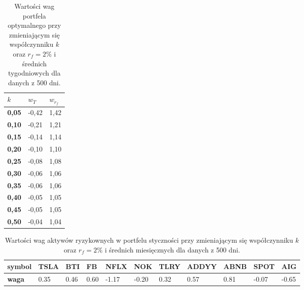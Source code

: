 \documentclass[magister]{dyplom}
\begin{document}
\begin{table}[ht]
	\centering
	\caption{Wartości wag portfela optymalnego przy zmieniającym się współczynniku $k$ oraz $r_f = 2\%$ i średnich tygodniowych dla danych z 500 dni.}
	\begin{tabular}{|l|l|l|}
		\hline
		\textbf{$k$} & \textbf{$w_T$} & \textbf{$w_{r_f}$} \\ \hline
		\textbf{0,05}                                             & -0,42         & 1,42           \\ \hline
		\textbf{0,10}                                             & -0,21         & 1,21           \\ \hline
		\textbf{0,15}                                             & -0,14         & 1,14           \\ \hline
		\textbf{0,20}                                             & -0,10         & 1,10           \\ \hline
		\textbf{0,25}                                             & -0,08         & 1,08           \\ \hline
		\textbf{0,30}                                             & -0,06         & 1,06           \\ \hline
		\textbf{0,35}                                             & -0,06         & 1,06           \\ \hline
		\textbf{0,40}                                             & -0,05         & 1,05           \\ \hline
		\textbf{0,45}                                             & -0,05         & 1,05           \\ \hline
		\textbf{0,50}                                             & -0,04         & 1,04           \\ \hline
	\end{tabular}
\end{table}
\begin{table}[ht]
	\centering
	\caption{Wartości wag aktywów ryzykownych w portfelu styczności przy zmieniającym się współczynniku $k$ oraz $r_f = 2\%$ i średnich miesięcznych dla danych z 500 dni.}
	\begin{tabular}{|l|l|l|l|l|l|l|l|l|l|l|}
		\hline
		\textbf{symbol} & \textbf{TSLA} & \textbf{BTI} & \textbf{FB} & \textbf{NFLX} & \textbf{NOK} & \textbf{TLRY} & \textbf{ADDYY} & \textbf{ABNB} & \textbf{SPOT} & \textbf{AIG} \\ \hline
		\textbf{waga}   & 0.35       & 0.46          & 0.60           & -1.17        & -0.20         & 0.32         & 0.57        & 0.81          & -0.07          & -0.65        \\ \hline
	\end{tabular}
\end{table}
\end{document}
